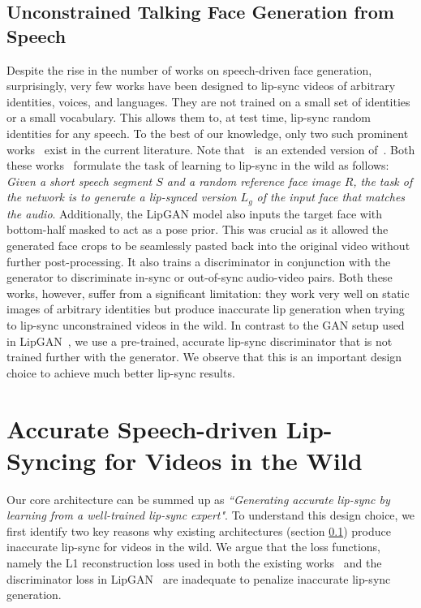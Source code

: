 \documentclass[sigconf]{acmart}
\begin{document}
\subsection{Unconstrained Talking Face Generation from Speech}
\label{subsection:unconstrained}
Despite the rise in the number of works on speech-driven face generation, surprisingly, very few works have been designed to lip-sync videos of arbitrary identities, voices, and languages. They are not trained on a small set of identities or a small vocabulary. This allows them to, at test time, lip-sync random identities for any speech. To the best of our knowledge, only two such prominent works~\cite{jamaludin2019you,kr2019towards} exist in the current literature. Note that~\cite{jamaludin2019you} is an extended version of~\cite{chung2017you}. Both these works~\cite{jamaludin2019you,kr2019towards} formulate the task of learning to lip-sync in the wild as follows: \textit{Given a short speech segment $S$ and a random reference face image $R$, the task of the network is to generate a lip-synced version $L_g$ of the input face that matches the audio}. Additionally, the LipGAN model also inputs the target face with bottom-half masked to act as a pose prior. This was crucial as it allowed the generated face crops to be seamlessly pasted back into the original video without further post-processing. It also trains a discriminator in conjunction with the generator to discriminate in-sync or out-of-sync audio-video pairs. Both these works, however, suffer from a significant limitation: they work very well on static images of arbitrary identities but produce inaccurate lip generation when trying to lip-sync unconstrained videos in the wild. In contrast to the GAN setup used in LipGAN~\cite{kr2019towards}, we use a pre-trained, accurate lip-sync discriminator that is not trained further with the generator. We observe that this is an important design choice to achieve much better lip-sync results. 

\section{Accurate Speech-driven Lip-Syncing for Videos in the Wild}
\label{section:arch}
Our core architecture can be summed up as \textit{``Generating accurate lip-sync by learning from a well-trained lip-sync expert"}. To understand this design choice, we first identify two key reasons why existing architectures (section \ref{subsection:unconstrained}) produce inaccurate lip-sync for videos in the wild. We argue that the loss functions, namely the L1 reconstruction loss used in both the existing works~\cite{kr2019towards,jamaludin2019you} and the discriminator loss in LipGAN~\cite{kr2019towards} are inadequate to penalize inaccurate lip-sync generation.
\end{document}
